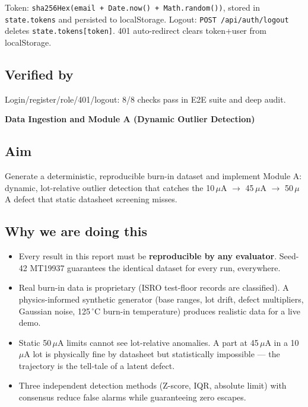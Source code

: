 \documentclass[11pt,a4paper]{article}
\newcommand{\code}[1]{\texttt{\small #1}}
\newcommand{\phasebox}[3]{\par\vspace{1em}\noindent
  \begin{tcolorbox}[colback=isroblue!6,colframe=isroblue,
    title={\sffamily\bfseries\color{white}#1 \quad [Progress: #2]},arc=2pt,boxrule=1.2pt]
    \textbf{#3}
  \end{tcolorbox}\par\vspace{0.4em}}
\begin{document}
\noindent Token: \code{sha256Hex(email + Date.now() + Math.random())}, stored in
\code{state.tokens} and persisted to localStorage. Logout: \code{POST /api/auth/logout}
deletes \code{state.tokens[token]}. 401 auto-redirect clears token+user from localStorage.

\subsection*{Verified by}
Login/register/role/401/logout: 8/8 checks pass in E2E suite and deep audit.

\phasebox{Phase 3}{35\% -- 60\%}{Data Ingestion and Module A (Dynamic Outlier Detection)}

\subsection*{Aim}
Generate a deterministic, reproducible burn-in dataset and implement Module A: dynamic,
lot-relative outlier detection that catches the 10\,$\mu$A $\rightarrow$ 45\,$\mu$A $\rightarrow$
50\,$\mu$A defect that static datasheet screening misses.

\subsection*{Why we are doing this}
\begin{itemize}[leftmargin=1.5em]
  \item Every result in this report must be \textbf{reproducible by any evaluator}. Seed-42
        MT19937 guarantees the identical dataset for every run, everywhere.
  \item Real burn-in data is proprietary (ISRO test-floor records are classified). A
        physics-informed synthetic generator (base ranges, lot drift, defect multipliers, Gaussian
        noise, 125\,$^{\circ}$C burn-in temperature) produces realistic data for a live demo.
  \item Static 50\,$\mu$A limits cannot see lot-relative anomalies. A part at 45\,$\mu$A in a
        10\,$\mu$A lot is physically fine by datasheet but statistically impossible --- the
        trajectory is the tell-tale of a latent defect.
  \item Three independent detection methods (Z-score, IQR, absolute limit) with consensus
        reduce false alarms while guaranteeing zero escapes.
\end{itemize}
\end{document}
